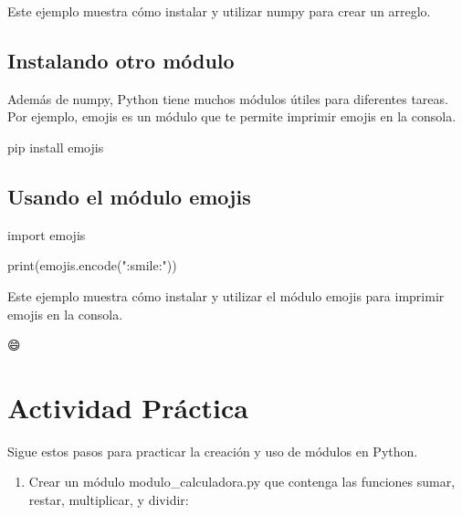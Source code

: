 \documentclass[
  a4paper,
  DIV=11,
  numbers=noendperiod,
  onepage,
  openany]{scrreprt}
\newenvironment{Shaded}{\begin{snugshade}}{\end{snugshade}}
\newcommand{\BuiltInTok}[1]{\textcolor[rgb]{0.00,0.23,0.31}{#1}}
\newcommand{\ExtensionTok}[1]{\textcolor[rgb]{0.00,0.23,0.31}{#1}}
\newcommand{\ImportTok}[1]{\textcolor[rgb]{0.00,0.46,0.62}{#1}}
\newcommand{\NormalTok}[1]{\textcolor[rgb]{0.00,0.23,0.31}{#1}}
\newcommand{\StringTok}[1]{\textcolor[rgb]{0.13,0.47,0.30}{#1}}
\providecommand{\tightlist}{%
  \setlength{\itemsep}{0pt}\setlength{\parskip}{0pt}}\usepackage{longtable,booktabs,array}
\begin{document}
Este ejemplo muestra cómo instalar y utilizar numpy para crear un
arreglo.

\section{Instalando otro módulo}\label{instalando-otro-muxf3dulo}

Además de numpy, Python tiene muchos módulos útiles para diferentes
tareas. Por ejemplo, emojis es un módulo que te permite imprimir emojis
en la consola.

\begin{Shaded}
\begin{Highlighting}[]
\ExtensionTok{pip}\NormalTok{ install emojis}
\end{Highlighting}
\end{Shaded}

\section{Usando el módulo emojis}\label{usando-el-muxf3dulo-emojis}

\begin{Shaded}
\begin{Highlighting}[]
\ImportTok{import}\NormalTok{ emojis}

\BuiltInTok{print}\NormalTok{(emojis.encode(}\StringTok{":smile:"}\NormalTok{))}
\end{Highlighting}
\end{Shaded}

Este ejemplo muestra cómo instalar y utilizar el módulo emojis para
imprimir emojis en la consola.

\begin{Shaded}
\begin{Highlighting}[]
\ExtensionTok{😄}
\end{Highlighting}
\end{Shaded}

\chapter{Actividad Práctica}\label{actividad-pruxe1ctica}

Sigue estos pasos para practicar la creación y uso de módulos en Python.

\begin{enumerate}
\def\labelenumi{\arabic{enumi}.}
\tightlist
\item
  Crear un módulo modulo\_calculadora.py que contenga las funciones
  sumar, restar, multiplicar, y dividir:
\end{enumerate}
\end{document}
